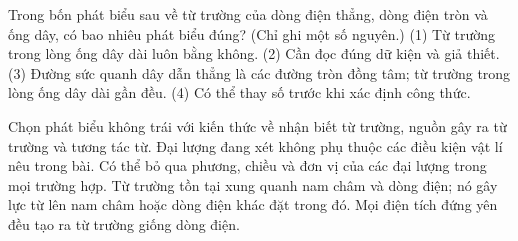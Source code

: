 \begin{ex}
Trong bốn phát biểu sau về từ trường của dòng điện thẳng, dòng điện tròn và ống dây, có bao nhiêu phát biểu đúng? (Chỉ ghi một số nguyên.) (1) Từ trường trong lòng ống dây dài luôn bằng không. (2) Cần đọc đúng dữ kiện và giả thiết. (3) Đường sức quanh dây dẫn thẳng là các đường tròn đồng tâm; từ trường trong lòng ống dây dài gần đều. (4) Có thể thay số trước khi xác định công thức.
\end{ex}

\begin{ex}
Chọn phát biểu không trái với kiến thức về nhận biết từ trường, nguồn gây ra từ trường và tương tác từ.
\choice
{Đại lượng đang xét không phụ thuộc các điều kiện vật lí nêu trong bài.}
{Có thể bỏ qua phương, chiều và đơn vị của các đại lượng trong mọi trường hợp.}
{\True Từ trường tồn tại xung quanh nam châm và dòng điện; nó gây lực từ lên nam châm hoặc dòng điện khác đặt trong đó.}
{Mọi điện tích đứng yên đều tạo ra từ trường giống dòng điện.}
\end{ex}

